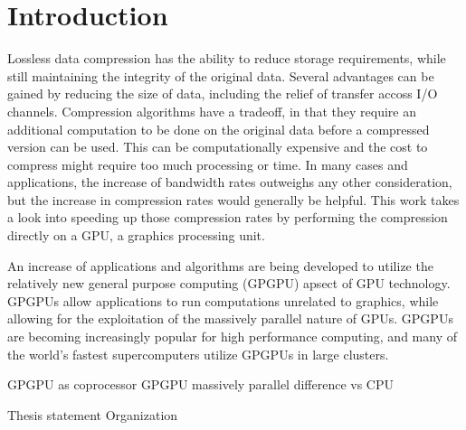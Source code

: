\chapter{Introduction}
Lossless data compression has the ability to reduce storage requirements, while still maintaining the integrity of the original data.
Several advantages can be gained by reducing the size of data, including the relief of transfer accoss I/O channels.
Compression algorithms have a tradeoff, in that they require an additional computation to be done on the original data before a compressed version can be used.
This can be computationally expensive and the cost to compress might require too much processing or time.
In many cases and applications, the increase of bandwidth rates outweighs any other consideration, but the increase in compression rates would generally be helpful.
This work takes a look into speeding up those compression rates by performing the compression directly on a GPU, a graphics processing unit.

An increase of applications and algorithms are being developed to utilize the relatively new general purpose computing (GPGPU) apsect of GPU technology.
GPGPUs allow applications to run computations unrelated to graphics, while allowing for the exploitation of the massively parallel nature of GPUs.
GPGPUs are becoming increasingly popular for high performance computing, and many of the world's fastest supercomputers utilize GPGPUs in large clusters.

GPGPU as coprocessor
GPGPU massively parallel
difference vs CPU

Thesis statement
Organization
